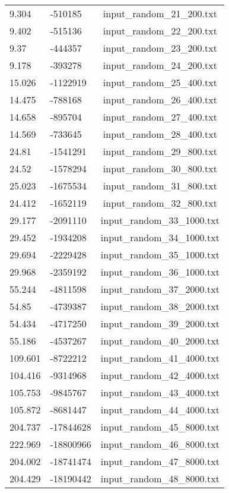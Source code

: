 \begin{longtable}[hb]{|l|l|c|}
    9.304 & -510185 & input\_random\_21\_200.txt \\
    9.402 & -515136 & input\_random\_22\_200.txt \\
    9.37 & -444357 & input\_random\_23\_200.txt \\
    9.178 & -393278 & input\_random\_24\_200.txt \\
    15.026 & -1122919 & input\_random\_25\_400.txt \\
    14.475 & -788168 & input\_random\_26\_400.txt \\
    14.658 & -895704 & input\_random\_27\_400.txt \\
    14.569 & -733645 & input\_random\_28\_400.txt \\
    24.81 & -1541291 & input\_random\_29\_800.txt \\
    24.52 & -1578294 & input\_random\_30\_800.txt \\
    25.023 & -1675534 & input\_random\_31\_800.txt \\
    24.412 & -1652119 & input\_random\_32\_800.txt \\
    29.177 & -2091110 & input\_random\_33\_1000.txt \\
    29.452 & -1934208 & input\_random\_34\_1000.txt \\
    29.694 & -2229428 & input\_random\_35\_1000.txt \\
    29.968 & -2359192 & input\_random\_36\_1000.txt \\
    55.244 & -4811598 & input\_random\_37\_2000.txt \\
    54.85 & -4739387 & input\_random\_38\_2000.txt \\
    54.434 & -4717250 & input\_random\_39\_2000.txt \\
    55.186 & -4537267 & input\_random\_40\_2000.txt \\
    109.601 & -8722212 & input\_random\_41\_4000.txt \\
    104.416 & -9314968 & input\_random\_42\_4000.txt \\
    105.753 & -9845767 & input\_random\_43\_4000.txt \\
    105.872 & -8681447 & input\_random\_44\_4000.txt \\
    204.737 & -17844628 & input\_random\_45\_8000.txt \\
    222.969 & -18800966 & input\_random\_46\_8000.txt \\
    204.002 & -18741474 & input\_random\_47\_8000.txt \\
    204.429 & -18190442 & input\_random\_48\_8000.txt \\

\end{longtable}
